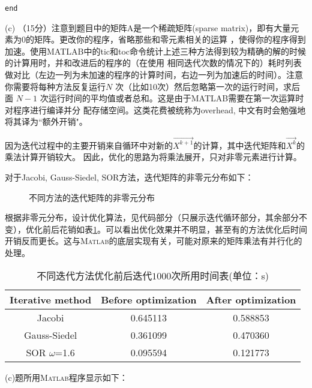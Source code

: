 \documentclass[12pt,a4paper,UTF8]{ctexart}
\begin{document}
\begin{enumerate}
\begin{lstlisting}[frame=single]
end
         \end{lstlisting}
          (c) （15分）注意到题目中的矩阵A是一个稀疏矩阵(sparse matrix)，即有大量元素为0的矩阵。更改你的程序，省略那些和零元素相关的运算
          ，使得你的程序得到加速。使用MATLAB中的tic和toc命令统计上述三种方法得到较为精确的解的时候的计算用时，并和改进后的程序的（在使用
          相同迭代次数的情况下的）耗时列表做对比（左边一列为未加速的程序的计算时间，右边一列为加速后的时间）。注意你需要将每种方法反复运行$N$
          次（比如10次）然后忽略第一次的运行时间，求后面 $N-1$ 次运行时间的平均值或者总和。这是由于MATLAB需要在第一次运算时对程序进行编译并分
          配存储空间。这类花费被统称为overhead, 中文有时会勉强地将其译为“额外开销"。

          因为迭代过程中的主要开销来自循环中对新的$\overrightarrow{X^{k+1}}$的计算，其中迭代矩阵和$\overrightarrow{X^{k}}$的乘法计算开销较大。
          因此，优化的思路为将乘法展开，只对非零元素进行计算。

          对于Jacobi, Gauss-Siedel, SOR方法，迭代矩阵的非零元分布如下：
          \begin{figure}[H] \centering
              \caption{不同方法的迭代矩阵的非零元分布}
              \label{fig}
          \end{figure}


          根据非零元分布，设计优化算法，见代码部分（只展示迭代循环部分，其余部分不变），优化前后花销如表\ref{tb1}。可以看出优化效果并不明显，甚至有的方法优化后时间开销反而更长。这与\textsc{Matlab}的底层实现有关，可能对原来的矩阵乘法有并行化的处理。
          \begin{table}[H]
              \centering
              \begin{tabular}{|c|c|c|}
                  \hline
                  \textbf{Iterative method} & \textbf{Before optimization} & \textbf{After optimization} \\ \hline
                  Jacobi                    & 0.645113                     & 0.588853                    \\ \hline
                  Gauss-Siedel              & 0.361099                     & 0.470360                    \\ \hline
                  SOR $\omega$=1.6          & 0.095594                     & 0.121773                    \\ \hline
              \end{tabular}
              \caption{不同迭代方法优化前后迭代$1000$次所用时间表(单位：s)}
              \label{tb1}
          \end{table}
          (c)题所用\textsc{Matlab}程序显示如下：
          \begin{lstlisting}[frame=single]
% Jacobi Part:


\end{lstlisting}
\end{enumerate}
\end{document}
